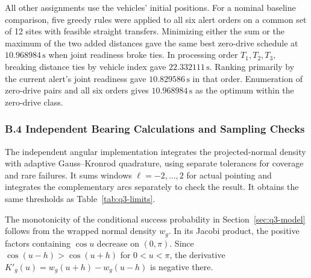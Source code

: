 \documentclass{swmcmthesis}
\begin{document}
All other assignments use the vehicles' initial positions. For a nominal baseline comparison, five greedy rules were applied to all six alert orders on a common set of 12 sites with feasible straight transfers. Minimizing either the sum or the maximum of the two added distances gave the same best zero-drive schedule at \(10.968984\,\mathrm s\) when joint readiness broke ties. In processing order \(T_1,T_2,T_3\), breaking distance ties by vehicle index gave \(22.332111\,\mathrm s\). Ranking primarily by the current alert's joint readiness gave \(10.829586\,\mathrm s\) in that order. Enumeration of zero-drive pairs and all six orders gives \(10.968984\,\mathrm s\) as the optimum within the zero-drive class.

\subsubsection*{B.4 Independent Bearing Calculations and Sampling Checks}
\label{app:q3-alternatives}

The independent angular implementation integrates the projected-normal density with adaptive Gauss--Kronrod quadrature, using separate tolerances for coverage and rare failures. It sums windows \(\ell=-2,\ldots,2\) for actual pointing and integrates the complementary arcs separately to check the result. It obtains the same thresholds as Table~\ref{tab:q3-limits}.

The monotonicity of the conditional success probability in Section~\ref{sec:q3-model} follows from the wrapped normal density \(w_g\). In its Jacobi product, the positive factors containing \(\cos u\) decrease on \((0,\pi)\). Since \(\cos(u-h)>\cos(u+h)\) for \(0<u<\pi\), the derivative \(K'_g(u)=w_g(u+h)-w_g(u-h)\) is negative there.
\end{document}
